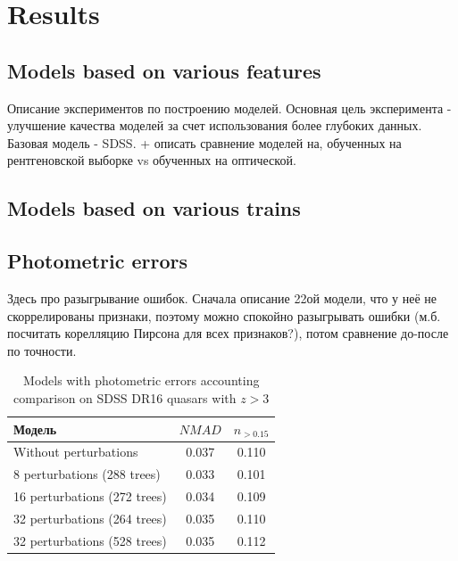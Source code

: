 \section{Results}\label{sec:exps}

\subsection{Models based on various features}

Описание экспериментов по построению моделей. Основная цель эксперимента - улучшение качества моделей за счет использования более глубоких данных. Базовая модель - SDSS. + описать сравнение моделей на, обученных на рентгеновской выборке vs обученных на оптической.

\subsection{Models based on various trains}

\subsection{Photometric errors}

Здесь про разыгрывание ошибок. Сначала описание 22ой модели, что у неё не скоррелированы признаки, поэтому можно спокойно разыгрывать ошибки (м.б. посчитать корелляцию Пирсона для всех признаков?), потом сравнение до-после по точности.

\begin{table}[ht]
    \centering
    \begin{tabular}{lcc}
    \hline
        Модель & $NMAD$ & $n_{>0.15}$ \\
    \hline
        Without perturbations & 0.037 & 0.110 \\
        8 perturbations (288 trees) & 0.033 & 0.101 \\
        16 perturbations (272 trees) & 0.034 & 0.109 \\
        32 perturbations (264 trees) & 0.035 & 0.110 \\
        32 perturbations (528 trees) & 0.035 & 0.112 \\
    \hline
    \end{tabular}
    \caption{Models with photometric errors accounting comparison on SDSS DR16 quasars with $z > 3$}
    \label{tab:perturbed}
\end{table}


